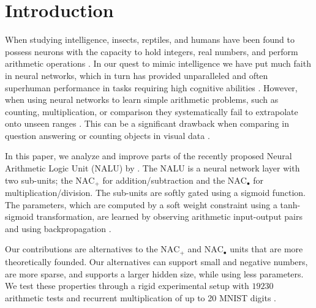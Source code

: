 \section{Introduction}
When studying intelligence, insects, reptiles, and humans have been found to possess neurons with the capacity to hold integers, real numbers, and perform arithmetic operations \cite{nieder-neuronal-number,rugani-arithmetic-chicks,gallistel-numbers-in-brain}.
In our quest to mimic intelligence we have put much faith in neural networks, which in turn has provided unparalleled and often superhuman performance in tasks requiring high cognitive abilities \cite{natureGo,bert,openai-learning-dexterous}.
However, when using neural networks to learn simple arithmetic problems, such as counting, multiplication, or comparison they systematically fail to extrapolate onto unseen ranges \cite{stillNotSystematic,suzgun2019evaluating,trask-nalu}. This can be a significant drawback when comparing in question answering \cite{naturalquestions} or counting objects in visual data \cite{johnson2017clevr,drewspaper}.

In this paper, we analyze and improve parts of the recently proposed Neural Arithmetic Logic Unit (NALU) by \citet{trask-nalu}.
The NALU is a neural network layer with two sub-units; the $\text{NAC}_{+}$ for addition/subtraction and the $\text{NAC}_{\bullet}$ for multiplication/division.
The sub-units are softly gated using a sigmoid function.
The parameters, which are computed by a soft weight constraint using a tanh-sigmoid transformation, are learned by observing arithmetic input-output pairs and using backpropagation \cite{rumelhart1986learning}.

Our contributions are alternatives to the $\text{NAC}_{+}$ and $\text{NAC}_{\bullet}$ units that are more theoretically founded.
Our alternatives can support small and negative numbers, are more sparse, and supports a larger hidden size, while using less parameters.
We test these properties through a rigid experimental setup with $19230$ arithmetic tests and recurrent multiplication of up to 20 MNIST digits \cite{mnist}.

